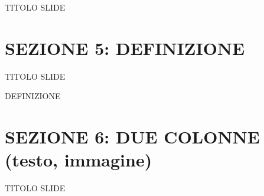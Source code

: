\documentclass[aspectratio=1610]{beamer}
\begin{document}
\begin{frame}{TITOLO SLIDE}
\end{frame}

\section{SEZIONE 5: DEFINIZIONE}

\begin{frame}{TITOLO SLIDE}
    \begin{alertblock}{DEFINIZIONE}
        \begin{minipage}{0.98\linewidth}
            \justifying
        \end{minipage}
    \end{alertblock}
\end{frame}

\section{SEZIONE 6: DUE COLONNE (testo, immagine)}

\begin{frame}{TITOLO SLIDE}
    \begin{columns}
            \justifying
    \end{columns}
\end{frame}
\end{document}
